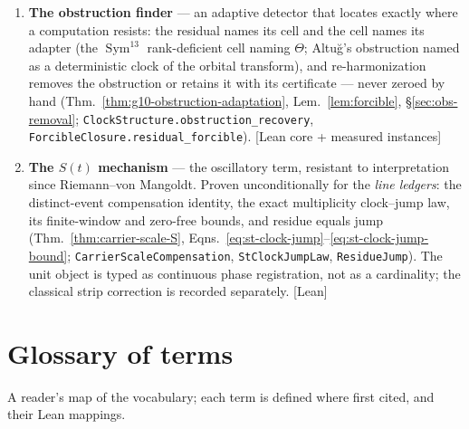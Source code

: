 \documentclass[11pt]{article}
\theoremstyle{definition}
\newcommand{\Sym}{\operatorname{Sym}}
\begin{document}
\begin{enumerate}
\item \textbf{The obstruction finder} --- an adaptive detector that locates exactly where a
computation resists: the residual names its cell and the cell names its adapter (the
$\Sym^{13}$ rank-deficient cell naming $\Theta$; Altu\u{g}'s obstruction named as a
deterministic clock of the orbital transform), and re-harmonization removes the obstruction or
retains it with its certificate --- never zeroed by hand
(Thm.~\ref{thm:g10-obstruction-adaptation}, Lem.~\ref{lem:forcible}, \S\ref{sec:obs-removal};
\texttt{ClockStructure.obstruction\_recovery}, \texttt{ForcibleClosure.residual\_forcible}).
[Lean core + measured instances]
\item \textbf{The $S(t)$ mechanism} --- the oscillatory term, resistant to
interpretation since Riemann--von Mangoldt. Proven unconditionally for the
\emph{line ledgers}: the distinct-event compensation identity, the exact
multiplicity clock--jump law, its finite-window and zero-free bounds, and
residue equals jump (Thm.~\ref{thm:carrier-scale-S},
Eqns.~\eqref{eq:st-clock-jump}--\eqref{eq:st-clock-jump-bound};
\texttt{CarrierScaleCompensation}, \texttt{StClockJumpLaw},
\texttt{ResidueJump}).  The unit object is typed as continuous phase
registration, not as a cardinality; the classical strip correction is
recorded separately. [Lean]
\end{enumerate}

\section*{Glossary of terms}
\noindent A reader's map of the vocabulary; each term is defined where first cited, and their Lean mappings.
\end{document}
